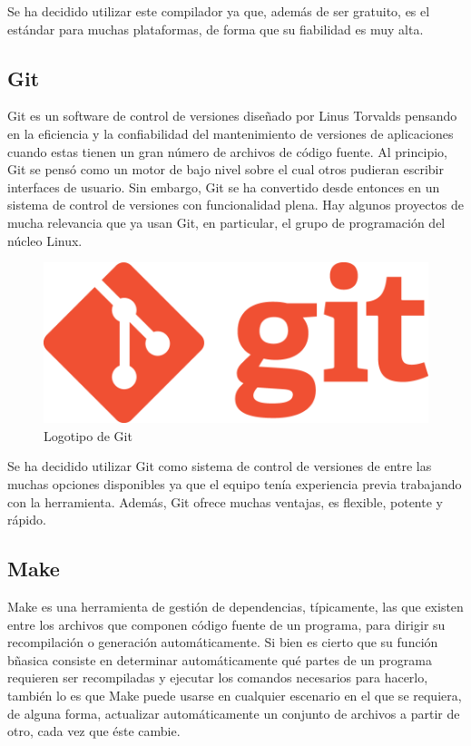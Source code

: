 		\FloatBarrier

		Se ha decidido utilizar este compilador ya que, además de ser gratuito, es el estándar para muchas plataformas, de forma que su fiabilidad es muy alta.

	\subsection{Git}

		Git es un software de control de versiones diseñado por Linus Torvalds pensando en la eficiencia y la confiabilidad del mantenimiento de versiones de aplicaciones cuando estas tienen un gran número de archivos de código fuente. Al principio, Git se pensó como un motor de bajo nivel sobre el cual otros pudieran escribir interfaces de usuario. Sin embargo, Git se ha convertido desde entonces en un sistema de control de versiones con funcionalidad plena. Hay algunos proyectos de mucha relevancia que ya usan Git, en particular, el grupo de programación del núcleo Linux.

		\begin{figure}[!htp]
			 \centering
			 \includegraphics[scale=.25]{fig/git}
			 \caption{Logotipo de Git}
			 \label{fig:git}
		\end{figure}

		\FloatBarrier

		Se ha decidido utilizar Git como sistema de control de versiones de entre las muchas opciones disponibles ya que el equipo tenía experiencia previa trabajando con la herramienta. Además, Git ofrece muchas ventajas, es flexible, potente y rápido.

	\subsection{Make}

		Make es una herramienta de gestión de dependencias, típicamente, las que existen entre los archivos que componen código fuente de un programa, para dirigir su recompilación o generación automáticamente. Si bien es cierto que su función bñasica consiste en determinar automáticamente qué partes de un programa requieren ser recompiladas y ejecutar los comandos necesarios para hacerlo, también lo es que Make puede usarse en cualquier escenario en el que se requiera, de alguna forma, actualizar automáticamente un conjunto de archivos a partir de otro, cada vez que éste cambie.

